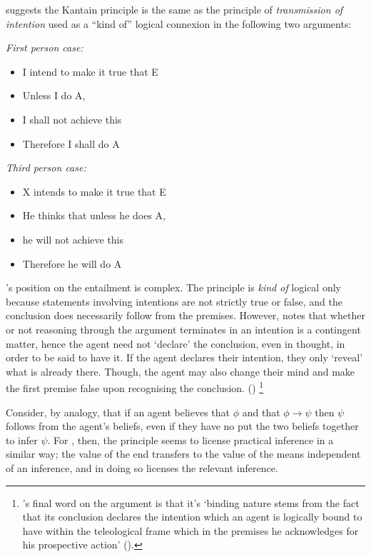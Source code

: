 \documentclass[10pt]{article}
\begin{document}
\citeauthor{Von-Wright:1972aa} suggests the Kantain principle is the same as the principle of \emph{transmission of intention} used as a ``kind of'' logical connexion in the following two arguments:
\begin{multicols}{2}
  \emph{First person case:}
  \begin{itemize}
  \item I intend to make it true that E
  \item Unless I do A,
  \item[] I shall not achieve this
  \item Therefore I shall do A
  \end{itemize}

  \columnbreak

  \emph{Third person case:}
  \begin{itemize}
  \item X intends to make it true that E
  \item He thinks that unless he does A,
  \item[] he will not achieve this
  \item Therefore he will do A
  \end{itemize}
\end{multicols}
\citeauthor{Von-Wright:1972aa}'s position on the entailment is complex.
The principle is \emph{kind of} logical only because statements involving intentions are not strictly true or false, and the conclusion does necessarily follow from the premises.
However, \citeauthor{Von-Wright:1972aa} notes that whether or not reasoning through the argument terminates in an intention is a contingent matter, hence the agent need not `declare' the conclusion, even in thought, in order to be said to have it.
If the agent declares their intention, they only `reveal' what is already there.
Though, the agent may also change their mind and make the first premise false upon recognising the conclusion.
(\citeyear[45]{Von-Wright:1972aa})\nolinebreak
\footnote{
  \citeauthor{Von-Wright:1972aa}'s final word on the argument is that it's `binding nature stems from the fact that its conclusion declares the intention which an agent is logically bound to have within the teleological frame which in the premises he acknowledges for his prospective action' (\citeyear[51]{Von-Wright:1972aa}).
}

Consider, by analogy, that if an agent believes that \(\phi\) and that \(\phi \rightarrow \psi\) then \(\psi\) follows from the agent's beliefs, even if they have no put the two beliefs together to infer \(\psi\).
For \citeauthor{Von-Wright:1972aa}, then, the principle seems to license practical inference in a similar way; the value of the end transfers to the value of the means independent of an inference, and in doing so licenses the relevant inference.
\end{document}
